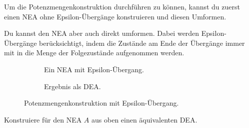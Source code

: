 \documentclass[fontsize=11pt, a4paper, ngerman]{scrartcl}
\begin{document}
\begin{aufgabe}
	\label{aufg:graph-3}
	Um die Potenzmengenkonstruktion durchführen zu können, kannst du zuerst einen NEA
	ohne Epsilon-Übergänge konstruieren und diesen Umformen.

	Du kannst den NEA aber auch direkt umformen. Dabei werden Epsilon-Übergänge
	berücksichtigt, indem die Zustände am Ende der Übergänge immer mit in die Menge der
	Folgezustände aufgenommen werden.

	\begin{figure}[h]
		\centering
		\begin{subfigure}{.5\textwidth}
		\centering
		  \begin{transitiongraph}[fa]
	  	 \end{transitiongraph}
	  	 \caption{Ein NEA mit Epsilon-Übergang.}
	  	 \label{abb:grah_2}
		\end{subfigure}%
		\begin{subfigure}{.5\textwidth}
		\centering
		  \begin{transitiongraph}[fa]
	  	 \end{transitiongraph}
	  	 \caption{Ergebnis als DEA.}
	  	 \label{abb:graph_3}
		\end{subfigure}
		\caption{Potenzmengenkonstruktion mit Epsilon-Übergang.}
	\end{figure}

	Konstruiere für den NEA $A$ aus  oben einen äquivalenten DEA.
\end{aufgabe}
\end{document}
